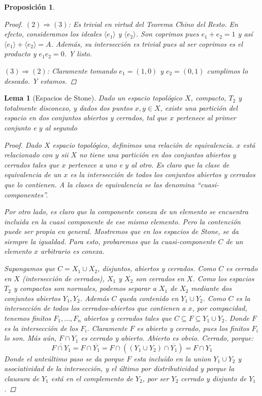\documentclass[11pt,a4paper, spanish,oneside,fleqn]{article}
\newtheorem{lem}[teo]{Lema}
\newtheorem{prop}[teo]{Proposición}
\theoremstyle{definition}
\begin{document}
\begin{prop}
\begin{proof}
$(2)\Longrightarrow (3)$: Es trivial en virtud del Teorema Chino del Resto. En efecto, consideramos los ideales $\langle e_1\rangle$ y $\langle e_2\rangle$. Son coprimos pues $e_1 + e_2=1$ y así $\langle e_1\rangle + \langle e_2\rangle = A$. Además, su intersección es trivial pues al ser coprimos es el producto y $e_1e_2=0$. Y listo.

$(3)\Longrightarrow (2)$: Claramente tomando $e_1= (1,0)$ y $e_2=(0,1)$ cumplimos lo deseado. Y estamos.
\end{proof}
\end{prop}


\begin{lem}[Espacios de Stone]
Dado un espacio topol\'ogico $X$, compacto, $T_2$ y totalmente disconexo, y dados
dos puntos $x,y \in X$, existe una partici\'on del espacio en dos
conjuntos abiertos y cerrados, tal que $x$ pertenece al primer conjunto
e $y$ al segundo
\begin{proof}
Dado $X$ espacio topol\'ogico, definimos una relaci\'on de equivalencia. $x$ est\'a
relacionado con $y$ sii $X$ no tiene una partici\'on en dos conjuntos abiertos y
cerrados tales que $x$ pertenece a uno e $y$ al otro. Es claro que la clase de
equivalencia de un $x$ es la intersecci\'on de todos los conjuntos abiertos y
cerrados que lo contienen. A la clases de equivalencia se las denomina ``cuasi-componentes''.

Por otro lado, es claro que la componente conexa de un elemento se encuentra incluida
en la cuasi componente de ese mismo elemento. Pero la contenci\'on puede ser propia
en general. Mostremos que en los espacios de Stone, se da siempre la igualdad.
Para esto, probaremos que la cuasi-componente $C$ de un elemento $x$ arbitrario es conexa.

Supongamos que $C = X_1 \cup X_2$, disjuntos, abiertos y cerrados.
Como $C$ es cerrado en $X$ (intersecci\'on de cerrados), $X_1$ y $X_2$ son cerrados
en $X$.
Como los espacios $T_2$ y compactos son normales, podemos separar a $X_1$ de $X_2$
mediante dos conjuntos abiertos $Y_1,Y_2$. Adem\'as $C$ queda contenido en $Y_1 \cup Y_2$.
Como $C$ es la intersecci\'on de todos los cerrados-abiertos que contienen a $x$, por compacidad,
tenemos finitos $F_1,\ldots,F_n$ abiertos y cerrados tales que
$C\subseteq F \subseteq Y_1 \cup Y_2$. Donde $F$ es la intersecci\'on de los $F_i$.
Claramente $F$ es abierto y cerrado, pues los finitos $F_i$ lo son.
M\'as a\'un, $F\cap Y_1$ es cerrado y abierto. Abierto es obvio.
Cerrado, porque:
$$\overline{F\cap Y_1} = F \cap \overline{Y_1} = F \cap ((Y_1 \cup Y_2) \cap \overline{Y_1}) = F \cap Y_1$$
Donde el ante\'ultimo paso se da porque $F$ esta inclu\'ido en la union $Y_1 \cup Y_2$ y asociatividad
de la intersecci\'on,
y el \'ultimo por distributividad y porque la clausura de $Y_1$ est\'a en el complemento de $Y_2$,
por ser $Y_2$ cerrado y disjunto de $Y_1$.


\end{proof}
\end{lem}
\end{document}
